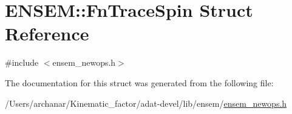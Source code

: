 \hypertarget{structENSEM_1_1FnTraceSpin}{}\section{E\+N\+S\+EM\+:\+:Fn\+Trace\+Spin Struct Reference}
\label{structENSEM_1_1FnTraceSpin}


{\ttfamily \#include $<$ensem\+\_\+newops.\+h$>$}



The documentation for this struct was generated from the following file\+:\begin{DoxyCompactItemize}
\item 
/\+Users/archanar/\+Kinematic\+\_\+factor/adat-\/devel/lib/ensem/\mbox{\hyperlink{adat-devel_2lib_2ensem_2ensem__newops_8h}{ensem\+\_\+newops.\+h}}\end{DoxyCompactItemize}
